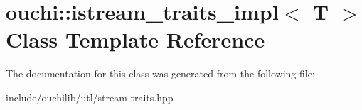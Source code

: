 \hypertarget{classouchi_1_1istream__traits__impl}{}\section{ouchi\+::istream\+\_\+traits\+\_\+impl$<$ T $>$ Class Template Reference}
\label{classouchi_1_1istream__traits__impl}


The documentation for this class was generated from the following file\+:\begin{DoxyCompactItemize}
\item 
include/ouchilib/utl/stream-\/traits.\+hpp\end{DoxyCompactItemize}
